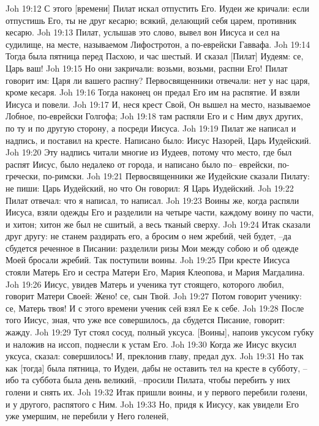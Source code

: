 Joh 19:12  С этого [времени] Пилат искал отпустить Его. Иудеи же кричали: если отпустишь Его, ты не друг кесарю; всякий, делающий себя царем, противник кесарю.
Joh 19:13  Пилат, услышав это слово, вывел вон Иисуса и сел на судилище, на месте, называемом Лифостротон, а по-еврейски Гаввафа.
Joh 19:14  Тогда была пятница перед Пасхою, и час шестый. И сказал [Пилат] Иудеям: се, Царь ваш!
Joh 19:15  Но они закричали: возьми, возьми, распни Его! Пилат говорит им: Царя ли вашего распну? Первосвященники отвечали: нет у нас царя, кроме кесаря.
Joh 19:16  Тогда наконец он предал Его им на распятие. И взяли Иисуса и повели.
Joh 19:17  И, неся крест Свой, Он вышел на место, называемое Лобное, по-еврейски Голгофа;
Joh 19:18  там распяли Его и с Ним двух других, по ту и по другую сторону, а посреди Иисуса.
Joh 19:19  Пилат же написал и надпись, и поставил на кресте. Написано было: Иисус Назорей, Царь Иудейский.
Joh 19:20  Эту надпись читали многие из Иудеев, потому что место, где был распят Иисус, было недалеко от города, и написано было по-- еврейски, по-гречески, по-римски.
Joh 19:21  Первосвященники же Иудейские сказали Пилату: не пиши: Царь Иудейский, но что Он говорил: Я Царь Иудейский.
Joh 19:22  Пилат отвечал: что я написал, то написал.
Joh 19:23  Воины же, когда распяли Иисуса, взяли одежды Его и разделили на четыре части, каждому воину по части, и хитон; хитон же был не сшитый, а весь тканый сверху.
Joh 19:24  Итак сказали друг другу: не станем раздирать его, а бросим о нем жребий, чей будет, --да сбудется реченное в Писании: разделили ризы Мои между собою и об одежде Моей бросали жребий. Так поступили воины.
Joh 19:25  При кресте Иисуса стояли Матерь Его и сестра Матери Его, Мария Клеопова, и Мария Магдалина.
Joh 19:26  Иисус, увидев Матерь и ученика тут стоящего, которого любил, говорит Матери Своей: Жено! се, сын Твой.
Joh 19:27  Потом говорит ученику: се, Матерь твоя! И с этого времени ученик сей взял Ее к себе.
Joh 19:28  После того Иисус, зная, что уже все совершилось, да сбудется Писание, говорит: жажду.
Joh 19:29  Тут стоял сосуд, полный уксуса. [Воины], напоив уксусом губку и наложив на иссоп, поднесли к устам Его.
Joh 19:30  Когда же Иисус вкусил уксуса, сказал: совершилось! И, преклонив главу, предал дух.
Joh 19:31  Но так как [тогда] была пятница, то Иудеи, дабы не оставить тел на кресте в субботу, --ибо та суббота была день великий, --просили Пилата, чтобы перебить у них голени и снять их.
Joh 19:32  Итак пришли воины, и у первого перебили голени, и у другого, распятого с Ним.
Joh 19:33  Но, придя к Иисусу, как увидели Его уже умершим, не перебили у Него голеней,
